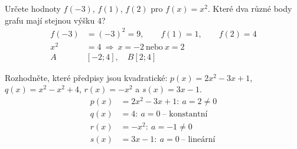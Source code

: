 \documentclass[11pt,a4paper]{article}
\begin{document}
\begin{prikladReseniBox}[title={Příklad 1}]
Určete hodnoty $f(-3)$, $f(1)$, $f(2)$ pro $f(x)=x^2$. Které dva různé body grafu mají stejnou výšku $4$?
\tcblower
\[
\begin{aligned}
f(-3)&=(-3)^2=9,\qquad f(1)=1,\qquad f(2)=4 \\
x^2&=4\ \Longrightarrow\ x=-2\ \text{nebo}\ x=2 \\
A&[-2;4],\quad B[2;4]
\end{aligned}
\]

\end{prikladReseniBox}
\begin{prikladReseniBox}[title={Příklad 2}]
Rozhodněte, které předpisy jsou kvadratické: $p(x)=2x^2-3x+1$, $q(x)=x^2-x^2+4$, $r(x)=-x^2$ a $s(x)=3x-1$.
\tcblower
\[
\begin{aligned}
p(x)&=2x^2-3x+1:\ a=2\ne0 \\
q(x)&=4:\ a=0\ \text{-- konstantní} \\
r(x)&=-x^2:\ a=-1\ne0 \\
s(x)&=3x-1:\ a=0\ \text{-- lineární}
\end{aligned}
\]

\end{prikladReseniBox}
\end{document}
